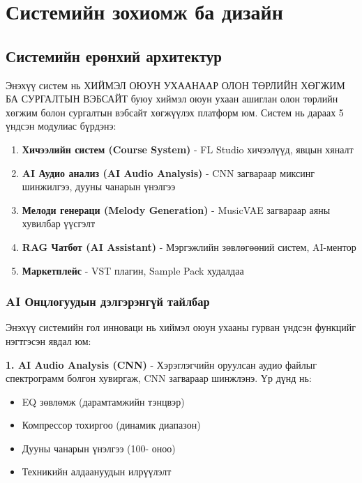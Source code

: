 
\chapter{Системийн зохиомж ба дизайн}
\label{Chapter3}

\section{Системийн ерөнхий архитектур}

Энэхүү систем нь ХИЙМЭЛ ОЮУН УХААНААР ОЛОН ТӨРЛИЙН ХӨГЖИМ БА СУРГАЛТЫН ВЭБСАЙТ буюу хиймэл оюун ухаан ашиглан олон төрлийн хөгжим болон сургалтын вэбсайт хөгжүүлэх платформ юм. Систем нь дараах 5 үндсэн модулиас бүрдэнэ:

\begin{enumerate}
    \item \textbf{Хичээлийн систем (Course System)} - FL Studio хичээлүүд, явцын хяналт
    \item \textbf{AI Аудио анализ (AI Audio Analysis)} - CNN загвараар миксинг шинжилгээ, дууны чанарын үнэлгээ
    \item \textbf{Мелоди генераци (Melody Generation)} - MusicVAE загвараар аяны хувилбар үүсгэлт
    \item \textbf{RAG Чатбот (AI Assistant)} - Мэргэжлийн зөвлөгөөний систем, AI-ментор
    \item \textbf{Маркетплейс} - VST плагин, Sample Pack худалдаа
\end{enumerate}

\subsection{AI Онцлогуудын дэлгэрэнгүй тайлбар}

Энэхүү системийн гол инноваци нь хиймэл оюун ухааны гурван үндсэн функцийг нэгтгэсэн явдал юм:

\textbf{1. AI Audio Analysis (CNN)} - Хэрэглэгчийн оруулсан аудио файлыг спектрограмм болгон хувиргаж, CNN загвараар шинжлэнэ. Үр дүнд нь:
\begin{itemize}
    \item EQ зөвлөмж (дарамтамжийн тэнцвэр)
    \item Компрессор тохиргоо (динамик диапазон)
    \item Дууны чанарын үнэлгээ (100- оноо)
    \item Техникийн алдаануудын илрүүлэлт
\end{itemize}


